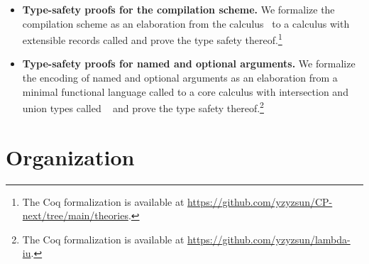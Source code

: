 \begin{itemize}
\item \textbf{Type-safety proofs for the compilation scheme.} We formalize the
      compilation scheme as an elaboration from the \lambdaiplus
      calculus~\citep{bi2018essence,huang2021taming} to a calculus with
      extensible records called \lambdar and prove the type safety
      thereof.\footnote{The Coq formalization is available at
      \url{https://github.com/yzyzsun/CP-next/tree/main/theories}.}
\item \textbf{Type-safety proofs for named and optional arguments.} We formalize
      the encoding of named and optional arguments as an elaboration from a
      minimal functional language called \uaena to a core calculus with
      intersection and union types called \lambdaiu~\citep{rehman2023blend} and
      prove the type safety thereof.\footnote{The Coq formalization is available
      at \url{https://github.com/yzyzsun/lambda-iu}.}
\end{itemize}

\section{Organization}

